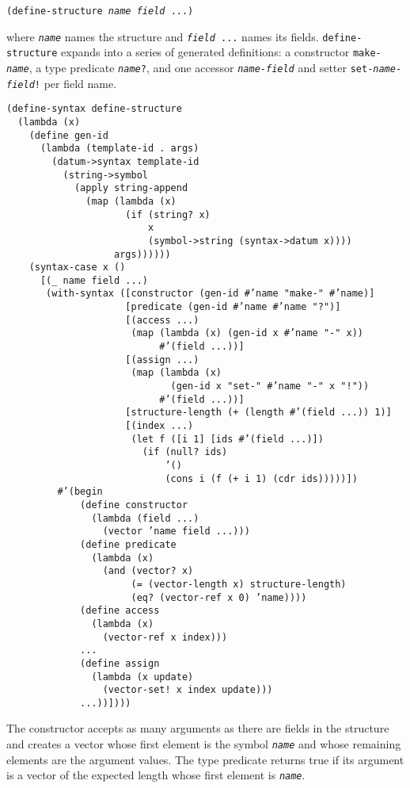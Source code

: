 \texttt{(define-structure \textit{name} \textit{field} ...)}

where \texttt{\textit{name}} names the structure and \texttt{\textit{field} ...} names its
fields.
\texttt{define-structure} expands into a series of generated definitions:
a constructor \texttt{make-\textit{name}}, a type predicate \texttt{\textit{name}?},
and one accessor \texttt{\textit{name}-\textit{field}} and setter
\texttt{set-\textit{name}-\textit{field}!} per field name.



\begin{alltt}
(define-syntax define-structure
  (lambda (x)
    (define gen-id
      (lambda (template-id . args)
        (datum-\textgreater{}syntax template-id
          (string-\textgreater{}symbol
            (apply string-append
              (map (lambda (x)
                     (if (string? x)
                         x
                         (symbol-\textgreater{}string (syntax-\textgreater{}datum x))))
                   args))))))
    (syntax-case x ()
      [(\_{} name field ...)
       (with-syntax ([constructor (gen-id \#{}'name "make-" \#{}'name)]
                     [predicate (gen-id \#{}'name \#{}'name "?")]
                     [(access ...)
                      (map (lambda (x) (gen-id x \#{}'name "-" x))
                           \#{}'(field ...))]
                     [(assign ...)
                      (map (lambda (x)
                             (gen-id x "set-" \#{}'name "-" x "!"))
                           \#{}'(field ...))]
                     [structure-length (+ (length \#{}'(field ...)) 1)]
                     [(index ...)
                      (let f ([i 1] [ids \#{}'(field ...)])
                        (if (null? ids)
                            '()
                            (cons i (f (+ i 1) (cdr ids)))))])
         \#{}'(begin
             (define constructor
               (lambda (field ...)
                 (vector 'name field ...)))
             (define predicate
               (lambda (x)
                 (and (vector? x)
                      (= (vector-length x) structure-length)
                      (eq? (vector-ref x 0) 'name))))
             (define access
               (lambda (x)
                 (vector-ref x index)))
             ...
             (define assign
               (lambda (x update)
                 (vector-set! x index update)))
             ...))])))
\end{alltt}


The constructor accepts as many arguments as there are fields in the
structure and creates a vector whose first element is the symbol
\texttt{\textit{name}} and whose remaining elements are the argument values.
The type predicate returns true if its argument is a vector
of the expected length whose first element is \texttt{\textit{name}}.


